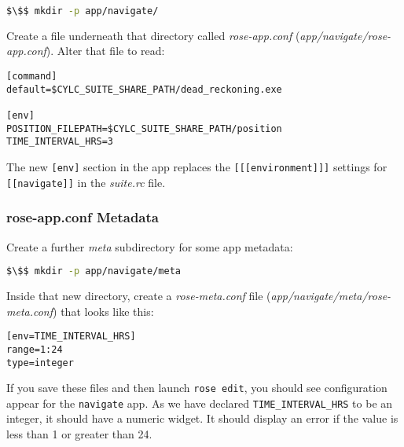 \begin{lstlisting}[mathescape, language=bash]
$\$$ mkdir -p app/navigate/
\end{lstlisting}

Create a file underneath that directory called {\em rose-app.conf} ({\em app/navigate/rose-app.conf}). Alter that file to read:

\lstset{language=suiterc}
\begin{lstlisting}[columns=fullflexible]
[command]
default=$CYLC_SUITE_SHARE_PATH/dead_reckoning.exe

[env]
POSITION_FILEPATH=$CYLC_SUITE_SHARE_PATH/position
TIME_INTERVAL_HRS=3
\end{lstlisting}

The new \lstinline{[env]} section in the app replaces the \lstinline{[[[environment]]]} settings for \lstinline{[[navigate]]} in the {\em suite.rc} file.

\subsubsection{rose-app.conf Metadata}

Create a further {\em meta} subdirectory for some app metadata:

\begin{lstlisting}[mathescape, language=bash]
$\$$ mkdir -p app/navigate/meta
\end{lstlisting}

Inside that new directory, create a {\em rose-meta.conf} file ({\em app/navigate/meta/rose-meta.conf}) that looks like this:

\lstset{language=suiterc}
\begin{lstlisting}[columns=fullflexible]
[env=TIME_INTERVAL_HRS]
range=1:24
type=integer
\end{lstlisting}

If you save these files and then launch \lstinline{rose edit}, you should see configuration appear for the \lstinline{navigate} app. As we have declared \lstinline{TIME_INTERVAL_HRS} to be an integer, it should have a numeric widget. It should display an error if the value is less than 1 or greater than 24.

